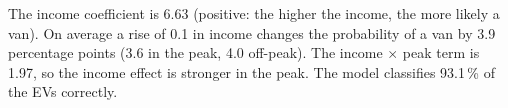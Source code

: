 The income coefficient is 6.63 (positive: the higher the income, the more likely a van). On average a rise of 0.1 in income changes the probability of a van by 3.9 percentage points (3.6 in the peak, 4.0 off-peak). The income $\times$ peak term is 1.97, so the income effect is stronger in the peak. The model classifies 93.1\,\% of the EVs correctly.
